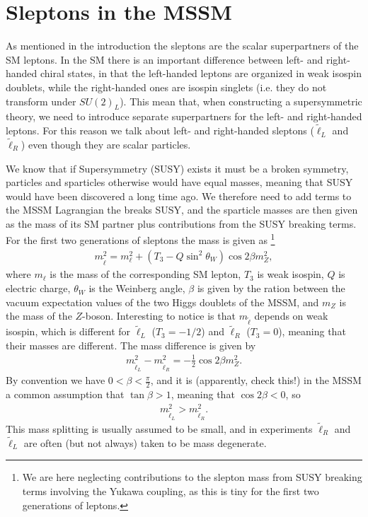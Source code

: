 \documentclass[twocolumn,a4paper,10pt]{article}
\begin{document}
\section{Sleptons in the MSSM}

As mentioned in the introduction the sleptons are the scalar superpartners of the SM leptons. In the 
SM there is an important difference between left- and right-handed chiral states, in that the 
left-handed leptons are organized in weak isospin doublets, while the right-handed ones are 
isospin singlets (i.e. they do not transform under $SU(2)_L$). This mean that, when constructing a 
supersymmetric theory, we need to introduce separate superpartners for the left- and right-handed leptons. 
For this reason we talk about left- and right-handed sleptons ($\tilde{\ell}_L$ and $\tilde{\ell}_R$) 
even though they are scalar particles. 

We know that if Supersymmetry (SUSY) exists it must be a broken symmetry, particles and sparticles 
otherwise would have equal masses, meaning that SUSY would have been discovered a long time ago.
We therefore need to add terms to the MSSM Lagrangian the breaks SUSY, and the sparticle masses are 
then given as the mass of its SM partner plus contributions from the SUSY breaking terms. For the first 
two generations of sleptons the mass is given as 
\footnote{We are here neglecting contributions to the slepton mass from SUSY breaking terms involving 
the Yukawa coupling, as this is tiny for the first two generations of leptons.}
\begin{align}
m_{\tilde{\ell}}^2 = m_{\ell}^2 + (T_3 - Q\sin^2\theta_W)\cos 2\beta m_Z^2, 
\end{align}  
where $m_{\ell}$ is the  mass of the corresponding SM lepton, $T_3$ is weak isospin, $Q$ is 
electric charge, $\theta_W$ is the Weinberg angle, $\beta$ is given by the ration between the 
vacuum expectation values of the two Higgs doublets of the MSSM, and $m_Z$ is the mass of the $Z$-boson.
Interesting to notice is that $m_{\tilde{\ell}}$ depends on weak isospin, which is different for 
$\tilde{\ell}_L$ ($T_3 = -1/2$) and $\tilde{\ell}_R$ ($T_3 = 0$), meaning that their masses are 
different. The mass difference is given by 
\begin{align}
m_{\tilde{\ell}_L}^2 - m_{\tilde{\ell}_R}^2 = -\frac{1}{2}\cos 2\beta m_Z^2.  
\end{align}  
By convention we have $0 < \beta < \frac{\pi}{2}$, and it is (apparently, check this!) in the MSSM a 
common assumption that $\tan\beta > 1$, meaning that $\cos 2\beta < 0$, so 
\begin{align*}
m_{\tilde{\ell}_L}^2 > m_{\tilde{\ell}_R}^2. 
\end{align*} 
This mass splitting is usually assumed to be small, and in experiments $\tilde{\ell}_R$ and 
$\tilde{\ell}_L$ are often (but not always) taken to be mass degenerate. 
\end{document}
